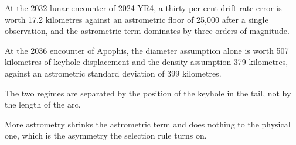 \begin{keytakeaways}
\item At the 2032 lunar encounter of 2024 YR4, a thirty per cent drift-rate
error is worth 17.2 kilometres against an astrometric floor of 25,000 after
a single observation, and the astrometric term dominates by three orders of
magnitude.
\item At the 2036 encounter of Apophis, the diameter assumption alone is
worth 507 kilometres of keyhole displacement and the density assumption 379
kilometres, against an astrometric standard deviation of 399 kilometres.
\item The two regimes are separated by the position of the keyhole in the
tail, not by the length of the arc.
\item More astrometry shrinks the astrometric term and does nothing to the
physical one, which is the asymmetry the selection rule turns on.
\end{keytakeaways}
